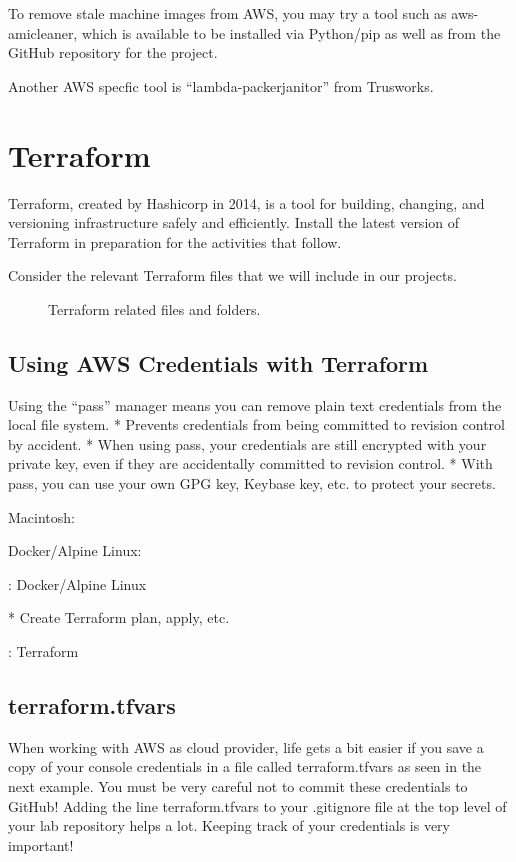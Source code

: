 \justifying
To remove stale machine images from AWS, you may try a tool such as
aws-amicleaner, which is available to be installed via Python/pip as well as from the
GitHub repository for the project.

\justifying
Another AWS specfic tool is ``lambda-packerjanitor'' from Trusworks.

\section{Terraform}
\justifying
Terraform, created by Hashicorp in 2014, is a tool for building, changing, and
versioning infrastructure safely and efficiently. Install the latest version of
Terraform in preparation for the activities that follow.

\justifying
Consider the relevant Terraform files that we will include in our
projects.

\begin{figure}[!htb]
	
	\caption{Terraform related files and folders.}
\label{terrafiles}
\end{figure}

\subsection{Using AWS Credentials with Terraform}
\justifying
 Using the ``pass'' manager means you can remove plain text credentials
  from the local file system.
  * Prevents credentials from being committed to revision control by accident.
  * When using pass, your credentials are still encrypted with your private key, even
    if they are accidentally committed to revision control.
  * With pass, you can use your own GPG key, Keybase key, etc. to protect
    your secrets.

Macintosh:


Docker/Alpine Linux:

\begin{mybox}{\thetcbcounter: Docker/Alpine Linux}
  
\end{mybox}

* Create Terraform plan, apply, etc.

\begin{mybox}{\thetcbcounter: Terraform}
  
\end{mybox}

\subsection{terraform.tfvars}
\justifying
When working with AWS as cloud provider, life gets a bit easier if you
save a copy of your console credentials in a file called
terraform.tfvars as seen in the next example. You must be very careful
not to commit these credentials to GitHub! Adding the line
terraform.tfvars to your .gitignore file at the top level of your lab
repository helps a lot. Keeping track of your credentials is very
important!

